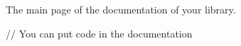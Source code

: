 The main page of the documentation of your library. 
\begin{DoxyCode}
\textcolor{comment}{// You can put code in the documentation }
\end{DoxyCode}
 